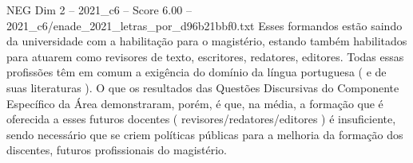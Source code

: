\begin{textsample}{NEG Dim 2 – 2021\_c6 – Score 6.00 – 2021\_c6/enade\_2021\_letras\_por\_d96b21bbf0.txt}
Esses formandos estão saindo da universidade com a habilitação para o magistério, estando também habilitados para atuarem como revisores de texto, escritores, redatores, editores.
Todas essas profissões têm em comum a exigência do domínio da língua portuguesa ( e de suas literaturas ).
O que os resultados das Questões Discursivas do Componente Específico da Área demonstraram, porém, é que, na média, a formação que é oferecida a esses futuros docentes ( revisores/redatores/editores ) é insuficiente, sendo necessário que se criem políticas públicas para a melhoria da formação dos discentes, futuros profissionais do magistério.

\end{textsample}
